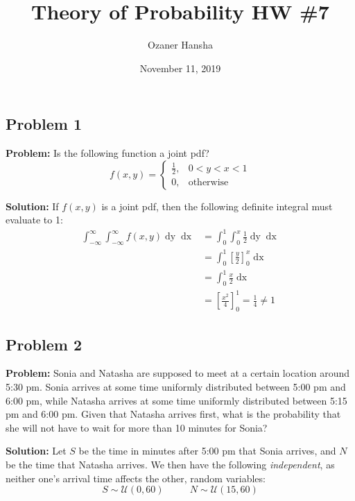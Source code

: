 \documentclass{article}
\newcommand*\eval[3]{\left[#1\right]_{#2}^{#3}}
\begin{document}
\title{Theory of Probability HW \#7}
\author{Ozaner Hansha}
\date{November 11, 2019}
\maketitle

\subsection*{Problem 1}
\noindent\textbf{Problem:} Is the following function a joint pdf?
\begin{equation*}
    f(x,y)=\begin{cases}
        \frac{1}{2},&0<y<x<1\\
        0,&\text{otherwise}
    \end{cases}
\end{equation*}


\noindent\textbf{Solution:} If $f(x,y)$ is a joint pdf, then the following definite integral must evaluate to 1:
\begin{align*}
    \int_{-\infty}^\infty\int_{-\infty}^\infty f(x,y)\mathop{dy}\mathop{dx}&=\int_0^1\int_0^x \frac{1}{2}\mathop{dy}\mathop{dx}\\
    &=\int_0^1\eval{\frac{y}{2}}{0}{x}\mathop{dx}\\
    &=\int_0^1\frac{x}{2}\mathop{dx}\\
    &=\eval{\frac{x^2}{4}}{0}{1}=\frac{1}{4}\not=1
\end{align*}


\subsection*{Problem 2}
\noindent\textbf{Problem:}  Sonia and Natasha are supposed to meet at a certain location around 5:30 pm. Sonia arrives at some time uniformly distributed between 5:00 pm and 6:00 pm, while Natasha arrives at some time uniformly distributed between 5:15 pm and 6:00 pm. Given that Natasha arrives first, what is the probability that she will not have to wait for more than 10 minutes for Sonia?
\bigskip

\noindent\textbf{Solution:} Let $S$ be the time in minutes after 5:00 pm that Sonia arrives, and $N$ be the time that Natasha arrives. We then have the following \textit{independent}, as neither one's arrival time affects the other, random variables:
\begin{equation*}
    S\sim\mathcal U(0,60)\,\,\,\,\,\,\,\,\,\,\,\,\,\,\,\,N\sim\mathcal U(15,60)
\end{equation*}
\end{document}

